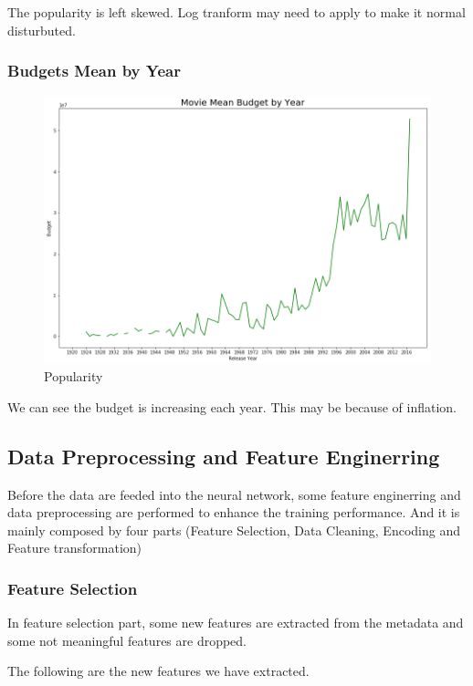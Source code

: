 \documentclass{article}
\begin{document}
The popularity is left skewed. Log tranform may need to apply to make it normal disturbuted.

\subsubsection{Budgets Mean by Year}
\begin{figure}[h]
  \centering
  \includegraphics[scale=0.4]{mean_budget.png}
  \caption{Popularity}
\end{figure}

We can see the budget is increasing each year. This may be because of inflation.


\subsection{Data Preprocessing and Feature Enginerring}

Before the data are feeded into the neural network, some feature enginerring and data preprocessing are performed to enhance the training performance. And it is mainly composed by four parts (Feature Selection, Data Cleaning, Encoding and Feature transformation)


\subsubsection{Feature Selection}

	In feature selection part, some new features are extracted from the metadata and some not meaningful features are dropped. 
	
The following are the new features we have extracted.
	
\end{document}
